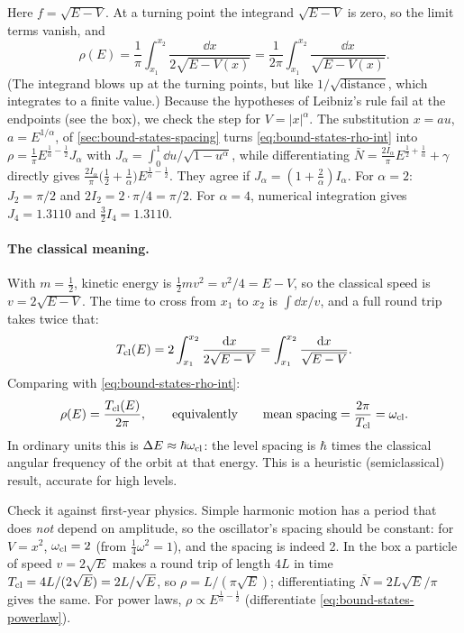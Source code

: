 Here $f=\sqrt{E-V}$. At a turning point the integrand $\sqrt{E-V}$ is zero, so the limit terms vanish, and
\begin{equation}
\rho(E)=\frac1\pi\int_{x_1}^{x_2}\frac{\dd x}{2\sqrt{E-V(x)}}=\frac{1}{2\pi}\int_{x_1}^{x_2}\frac{\dd x}{\sqrt{E-V(x)}} .
\label{eq:bound-states-rho-int}
\end{equation}
(The integrand blows up at the turning points, but like $1/\sqrt{\text{distance}}$, which integrates to a finite value.) Because the hypotheses of Leibniz's rule fail at the endpoints (see the box), we check the step for $V=|x|^\alpha$. The substitution $x=au$, $a=E^{1/\alpha}$, of \cref{sec:bound-states-spacing} turns \cref{eq:bound-states-rho-int} into $\rho=\frac1\pi E^{\frac1\alpha-\frac12}J_\alpha$ with $J_\alpha=\int_0^1\dd u/\sqrt{1-u^\alpha}$, while differentiating $\bar N=\frac{2I_\alpha}{\pi}E^{\frac12+\frac1\alpha}+\gamma$ directly gives $\frac{2I_\alpha}{\pi}\bigl(\frac12+\frac1\alpha\bigr)E^{\frac1\alpha-\frac12}$. They agree if $J_\alpha=(1+\frac2\alpha)I_\alpha$. For $\alpha=2$: $J_2=\pi/2$ and $2I_2=2\cdot\pi/4=\pi/2$. For $\alpha=4$, numerical integration gives $J_4=1.3110$ and $\frac32I_4=1.3110$. 

\paragraph{The classical meaning.} With $m=\tfrac12$, kinetic energy is $\tfrac12mv^2=v^2/4=E-V$, so the classical speed is $v=2\sqrt{E-V}$. The time to cross from $x_1$ to $x_2$ is $\int\dd x/v$, and a full round trip takes twice that:
\[
T_{\rm cl}(E)=2\int_{x_1}^{x_2}\frac{\mathrm{d} x}{2\sqrt{E-V}}=\int_{x_1}^{x_2}\frac{\mathrm{d} x}{\sqrt{E-V}} .
\]
Comparing with \cref{eq:bound-states-rho-int}:
\begin{equation}
\rho(E)=\frac{T_{\rm cl}(E)}{2\pi},\qquad\text{equivalently}\qquad\text{mean spacing}=\frac{2\pi}{T_{\rm cl}}=\omega_{\rm cl}.
\label{eq:bound-states-period}
\end{equation}
In ordinary units this is $\Delta E\approx\hbar\omega_{\rm cl}$: the level spacing is $\hbar$ times the classical angular frequency of the orbit at that energy. This is a heuristic (semiclassical) result, accurate for high levels.

Check it against first-year physics. Simple harmonic motion has a period that does \emph{not} depend on amplitude, so the oscillator's spacing should be constant: for $V=x^2$, $\omega_{\rm cl}=2$ (from $\tfrac14\omega^2=1$), and the spacing is indeed 2. In the box a particle of speed $v=2\sqrt E$ makes a round trip of length $4L$ in time $T_{\rm cl}=4L/(2\sqrt E)=2L/\sqrt E$, so $\rho=L/(\pi\sqrt E)$; differentiating $\bar N=2L\sqrt E/\pi$ gives the same. For power laws, $\rho\propto E^{\frac1\alpha-\frac12}$ (differentiate \cref{eq:bound-states-powerlaw}).

